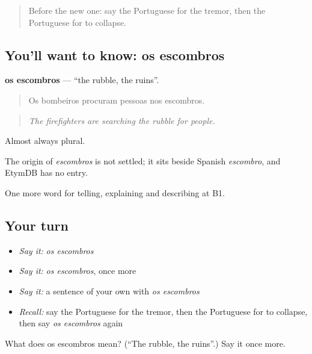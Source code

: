 \label{lesson:PT-C302-escombros}



\begin{quote}
Before the new one: say the Portuguese for the tremor, then the Portuguese for to collapse.
\end{quote}

\subsection*{You'll want to know: os escombros}
\textbf{os escombros} — \textquotedblleft{}the rubble, the ruins\textquotedblright{}.

\begin{quote}
Os bombeiros procuram pessoas nos escombros.
\end{quote}

\begin{quote}
\emph{The firefighters are searching the rubble for people.}
\end{quote}

Almost always plural.

\begin{cousinweb}
The origin of \emph{escombros} is not settled; it sits beside Spanish \emph{escombro}, and EtymDB has no entry.
\end{cousinweb}

\begin{grammarlens}[title={What you've built}]
One more word for telling, explaining and describing at B1.
\end{grammarlens}

\subsection*{Your turn}
\begin{itemize}
\raggedright
  \item \emph{Say it:} \emph{os escombros}
  \item \emph{Say it:} \emph{os escombros}, once more
  \item \emph{Say it:} a sentence of your own with \emph{os escombros}
  \item \emph{Recall:} say the Portuguese for the tremor, then the Portuguese for to collapse, then say \emph{os escombros} again
\end{itemize}

\begin{tcolorbox}[breakable,colback=teal!4,colframe=teal!35!black,title={Before you move on}]
What does os escombros mean? (\textquotedblleft{}The rubble, the ruins\textquotedblright{}.) Say it once more.
\end{tcolorbox}
